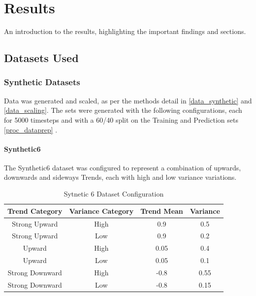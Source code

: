 \documentclass[a4paper,11pt,oneside]{article}
\theoremstyle{plain}
\theoremstyle{definition}
\begin{document}
\newpage
\section{Results}\label{Results}


An introduction to the results, highlighting the important findings and sections. \todo{}

\subsection{Datasets Used}

\subsubsection{Synthetic Datasets}

Data was generated and scaled, as per the methods detail in \ref{data_synthetic} and \ref{data_scaling}. The sets were generated with the following configurations, each for 5000 timesteps and with a 60/40 split on the Training and Prediction sets \ref{proc_dataprep} .

\paragraph{Synthetic6} \label{dataset_synthetic6}

The Synthetic6 dataset was configured to represent a combination of upwards, downwards and sideways Trends, each with high and low variance variations.

	\begin{table}[h]
		\centering
		\begin{tabular}{|c|c|c|c|}
			\hline
			\textbf{Trend Category} &\textbf{Variance Category} & \textbf{Trend Mean} & \textbf{Variance}\\\hline	
			{Strong Upward} & {High} & {0.9} & {0.5} \\\hline
			{Strong Upward} & {Low} & {0.9} & {0.2} \\\hline
			{Upward} & {High} & {0.05} & {0.4} \\\hline
			{Upward} & {Low} & {0.05} & {0.1} \\\hline
			{Strong Downward} & {High} & {-0.8} & {0.55} \\\hline
			{Strong Downward} & {Low} & {-0.8} & {0.15} \\\hline
		\end{tabular}
		\newline\newline
		\caption{Sytnetic 6 Dataset Configuration}\label{tab_synth6}
	\end{table}
\end{document}
